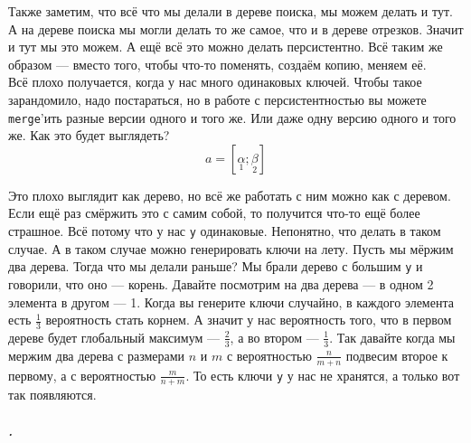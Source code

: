 \documentclass{article}
\newcommand{\pseudo}{PseudoLexer.py:PseudoLexer -x}
\newcommand{\pseudocode}[1]{\texttt{#1}}
\begin{document}
    Также заметим, что всё что мы делали в дереве поиска, мы можем делать и тут. А на дереве поиска мы могли делать то же самое, что и в дереве отрезков. Значит и тут мы это можем. А ещё всё это можно делать персистентно. Всё таким же образом --- вместо того, чтобы что-то поменять, создаём копию, меняем её.\\
    Всё плохо получается, когда у нас много одинаковых ключей. Чтобы такое зарандомило, надо постараться, но в работе с персистентностью вы можете \pseudocode{merge}'ить разные версии одного и того же. Или даже одну версию одного и того же. Как это будет выглядеть?
    $$a=[\underset1\alpha;\underset2\beta]$$
    \begin{center}
        \qquad\qquad
    \end{center}
    Это плохо выглядит как дерево, но всё же работать с ним можно как с деревом. Если ещё раз смёржить это с самим собой, то получится что-то ещё более страшное. Всё потому что у нас \pseudocode{y} одинаковые. Непонятно, что делать в таком случае. А в таком случае можно генерировать ключи на лету. Пусть мы мёржим два дерева. Тогда что мы делали раньше? Мы брали дерево с большим \pseudocode{y} и говорили, что оно --- корень. Давайте посмотрим на два дерева --- в одном 2 элемента в другом --- 1. Когда вы генерите ключи случайно, в каждого элемента есть $\frac13$ вероятность стать корнем. А значит у нас вероятность того, что в первом дереве будет глобальный максимум --- $\frac23$, а во втором --- $\frac13$. Так давайте когда мы мержим два дерева с размерами $n$ и $m$ с вероятностью $\frac n{m+n}$ подвесим второе к первому, а с вероятностью $\frac m{n+m}$. То есть ключи \pseudocode{y} у нас не хранятся, а только вот так появляются.
    \subparagraph{.}
\end{document}
